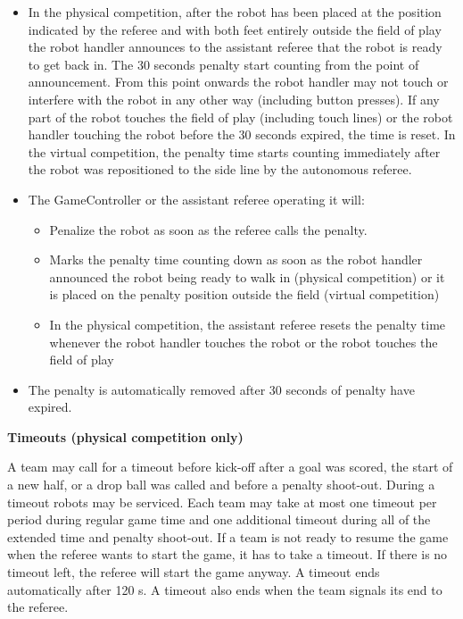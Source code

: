 \begin{itemize}
\item In the physical competition, after the robot has been placed at the position indicated by the referee
      and with both feet entirely outside the field of play the robot handler
      announces to the assistant referee that the robot is ready to get back in.
      The 30 seconds penalty start counting from the point of announcement.
      From this point onwards the robot handler may not touch or interfere with
      the robot in any other way (including button presses).
      If any part of the robot touches the field of play (including touch lines)
      or the robot handler touching the robot before the 30 seconds expired,
      the time is reset. In the virtual competition, the penalty time starts counting immediately after the robot was repositioned to the side line by the autonomous referee.
\item The GameController or the assistant referee operating it will:
  \begin{itemize}
  \item Penalize the robot as soon as the referee calls the penalty.
  \item Marks the penalty time counting down as soon as the robot handler
      announced the robot being ready to walk in (physical competition) or it is placed on the penalty position outside the field (virtual competition)
  \item In the physical competition, the assistant referee resets the penalty time whenever the robot handler touches the robot or
      the robot touches the field of play
  \end{itemize}
\item The penalty is automatically removed after 30 seconds of penalty have expired.
\end{itemize}

\bigskip

{\bfseries Timeouts (physical competition only)}

A team may call for a timeout before kick-off after a goal was scored,
the start of a new half, or a drop ball was called and before a penalty shoot-out.
During a timeout robots may be serviced.
Each team may take at most one timeout per period during regular game time and
one additional timeout during all of the extended time and penalty shoot-out.
If a team is not ready to resume the game when the referee wants to start the game,
it has to take a timeout.
If there is no timeout left, the referee will start the game anyway.
A timeout ends automatically after 120 s.
A timeout also ends when the team signals its end to the referee.

